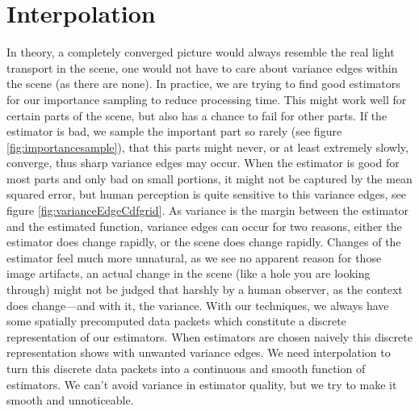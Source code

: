 \section{Interpolation}
\label{ch:interpolation}

In theory, a completely converged picture would always resemble the real light transport in the scene, one would not have to care about variance edges within the scene (as there are none). In practice, we are trying to find good estimators for our importance sampling to reduce processing time. This might work well for certain parts of the scene, but also has a chance to fail for other parts. If the estimator is bad, we sample the important part so rarely (see figure \ref{fig:importancesample}), that this parts might never, or at least extremely slowly, converge, thus sharp variance edges may occur. When the estimator is good for most parts and only bad on small portions, it might not be captured by the mean squared error, but human perception is quite sensitive to this variance edges, see figure \ref{fig:varianceEdgeCdfgrid}. As variance is the margin between the estimator and the estimated function, variance edges can occur for two reasons, either the estimator does change rapidly, or the scene does change rapidly. Changes of the estimator feel much more unnatural, as we see no apparent reason for those image artifacts, an actual change in the scene (like a hole you are looking through) might not be judged that harshly by a human observer, as the context does change---and with it, the variance. With our techniques, we always have some spatially precomputed data packets which constitute a discrete representation of our estimators. When estimators are chosen naively this discrete representation shows with unwanted variance edges. We need interpolation to turn this discrete data packets into a continuous and smooth function of estimators. We can't avoid variance in estimator quality, but we try to make it smooth and unnoticeable.

%    

